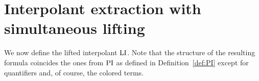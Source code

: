 \begin{comment}
\end{proof}

\addtocounter{exa}{-2}
\begin{exa}[continued]
	In the formulation as given in Lemma~\ref{lemma:lifting_tau_commute}, we observe the required property:
	
	$\lifboth{ \lifboth{ x} } \sigma = \lifboth{x \sigma}$

	$\lifboth{ \lifboth{ z_{f(x)} } \sigma } = \lifboth{z_{f(x)} \sigma}$

	\mytodo{elaborate, make connection to example above obvious}
\end{exa}
\addtocounter{exa}{1}


\begin{lemma}
	\label{lemma:substitute_and_lift}
	Let $\sigma$ be a substitution and $F$ a formula without $\Phi$-colored terms such that for a set of formulas $\Psi$ which does not contain $\Phi$-lifting variables, $\Psi \entails F$.
	Then $\Psi \entails \lifphinovar{F\sigma}$.
\end{lemma}
\begin{proof}
	$\lifphinovar{F\sigma}$ is an instance of $F$:
	$\sigma$ substitutes variables either for terms which do not contain $\Phi$-colored symbols or by terms containing $\Phi$-colored symbols.
	For the first kind, the lifting has no effect.
	For the latter, the lifting only replaces subterms of the terms introduced by the substitution by a lifting variable such that the original structure of $F$ remains invariant as it by assumption does not contain colored terms.
\end{proof}

\end{comment}

\section{Interpolant extraction with simultaneous lifting}

We now define the lifted interpolant $\operatorname{LI}$.
Note that the structure of the resulting formula coincides the ones from $\operatorname{PI}$ as defined in Definition~\ref{def:PI} except for quantifiers and, of course, the colored terms.

